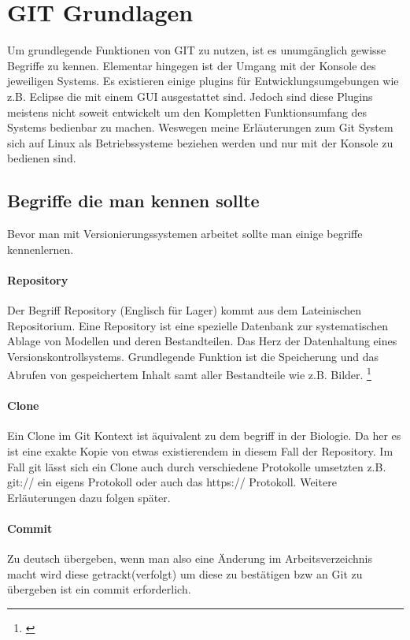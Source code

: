 \documentclass[12pt,a4paper,bibliography=totocnumbered,listof=totocnumbered]{scrartcl}
\begin{document}
\section{GIT Grundlagen}
Um grundlegende Funktionen von GIT zu nutzen, ist es unumgänglich gewisse Begriffe zu kennen. Elementar hingegen ist der Umgang mit der Konsole des jeweiligen Systems. Es existieren einige plugins für Entwicklungsumgebungen wie z.B. Eclipse die mit einem GUI ausgestattet sind. Jedoch sind diese Plugins meistens nicht soweit entwickelt um den Kompletten Funktionsumfang des Systems bedienbar zu machen.
Weswegen meine Erläuterungen zum Git System sich auf Linux als Betriebssysteme beziehen werden und nur mit der Konsole zu bedienen sind.     

\subsection{Begriffe die man kennen sollte}
Bevor man mit Versionierungssystemen arbeitet sollte man einige begriffe kennenlernen. 
\paragraph{Repository}
Der Begriff Repository (Englisch für Lager) kommt aus dem Lateinischen Repositorium.
Eine Repository ist eine spezielle Datenbank zur systematischen Ablage von Modellen und deren Bestandteilen. Das Herz der Datenhaltung eines Versionskontrollsystems. Grundlegende Funktion ist die Speicherung und das Abrufen von gespeichertem Inhalt samt aller Bestandteile wie z.B. Bilder. \footnote{\cite{Leymann}} 

\paragraph{Clone}
Ein Clone im Git Kontext ist äquivalent zu dem begriff in der Biologie. Da her es ist eine exakte Kopie von etwas existierendem in diesem Fall der Repository. Im Fall git lässt sich  ein Clone auch durch verschiedene Protokolle umsetzten z.B. git:// ein eigens Protokoll oder auch das https:// Protokoll. Weitere Erläuterungen dazu folgen später. 
\paragraph{Commit}
Zu deutsch übergeben, wenn man also eine Änderung im Arbeitsverzeichnis macht wird diese getrackt(verfolgt) um diese zu bestätigen bzw an Git zu übergeben ist ein commit erforderlich. 
\end{document}
